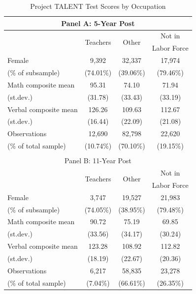 \documentclass[onehalfspacing,11pt]{article}
\begin{document}
	\begin{table}[h!]
		\centering 
		\begin{tabular}{lccc}
			\toprule
			\multicolumn{4}{c}{Panel A: 5-Year Post}\\
			\midrule
			& \multirow{2}{*}{Teachers} & \multirow{2}{*}{Other} & Not in \\
			&  &  & Labor Force \\
			\midrule
			Female & 9,392 & 32,337 & 17,974 \\
			\quad (\% of subsample) & (74.01\%) & (39.06\%) & (79.46\%) \\
			\midrule
			Math composite mean & 95.31 & 74.10 & 71.94 \\
			\quad (st.dev.) & (31.78) & (33.43) & (33.19) \\
			\midrule
			Verbal composite mean & 126.26 & 109.63 & 112.67 \\
			\quad (st.dev.) & (16.44) & (22.09) & (21.08) \\
			\midrule
			Observations & 12,690 & 82,798 & 22,620 \\
			\quad (\% of total sample) & (10.74\%) & (70.10\%) & (19.15\%) \\
			\bottomrule
			\\
			\toprule
			
			\multicolumn{4}{c}{Panel B: 11-Year Post} \\
			\midrule
			& \multirow{2}{*}{Teachers} & \multirow{2}{*}{Other} & Not in \\
			&  &  & Labor Force \\
			\midrule
			Female & 3,747 & 19,527 & 21,983 \\
			\quad (\% of subsample) & (74.05\%) & (38.95\%) & (79.48\%) \\
			\midrule
			Math composite mean & 90.72 & 75.19 & 69.85 \\
			\quad (st.dev.) & (33.56) & (34.17) & (30.24) \\
			\midrule
			Verbal composite mean & 123.28 & 108.92 & 112.82 \\
			\quad (st.dev.) & (18.19) & (22.67) & (20.36) \\
			\midrule
			Observations & 6,217 & 58,835 & 23,278 \\
			\quad (\% of total sample) & (7.04\%) & (66.61\%) & (26.35\%) \\
			\bottomrule
		\end{tabular}
		\caption{Project TALENT Test Scores by Occupation}
		\label{tab:PTscores}
	\end{table}
	
\end{document}
